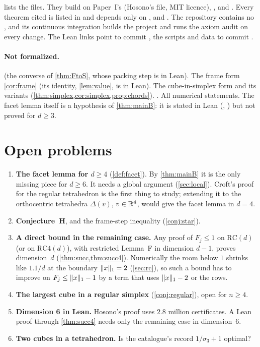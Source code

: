 \documentclass[11pt,a4paper]{article}
\begin{document}
 lists the files. They build on Paper~I's  (Hosono's file, MIT licence), ,  and . Every theorem cited is listed in  and depends only on ,  and . The repository contains no , and its continuous integration builds the project and runs the axiom audit on every change. The Lean links point to commit \leancommitshort, the scripts and data to commit \evidencecommit.

\paragraph{Not formalized.}  (the converse of \cref{thm:FtoS}, whose packing step is in Lean). The frame form \cref{cor:frame} (its identity, \cref{lem:value}, is in Lean). The cube-in-simplex form and its variants (\cref{thm:simplex,cor:simplex,prop:chords}). . All numerical statements. The facet lemma itself is a hypothesis of \cref{thm:mainB}: it is stated in Lean (, ) but not proved for $d\ge3$.

\section{Open problems}\label{sec:open}
\begin{enumerate}
\item \textbf{The facet lemma for $d\ge4$} (\cref{def:facet}). By \cref{thm:mainB} it is the only missing piece for $d\ge6$. It needs a global argument (\cref{sec:local}). Croft's proof for the regular tetrahedron is the first thing to study; extending it to the orthocentric tetrahedra $\Delta(v)$, $v\in\mathbb R^4$, would give the facet lemma in $d=4$.
\item \textbf{Conjecture~H}, and the frame-step inequality (\cref{conj:star}).
\item \textbf{A direct bound in the remaining case.} Any proof of $F_j\le1$ on $\mathrm{RC}(d)$ (or on $\mathrm{RC4}(d)$), with restricted Lemma~F in dimension $d-1$, proves dimension~$d$ (\cref{thm:succ,thm:succ4}). Numerically the room below $1$ shrinks like $1.1/d$ at the boundary $\lVert x\rVert_1=2$ (\cref{sec:rc}), so such a bound has to improve on $F_j\le\lVert x\rVert_1-1$ by a term that uses $\lVert x\rVert_1-2$ or the rows.
\item \textbf{The largest cube in a regular simplex} (\cref{conj:regular}), open for $n\ge4$.
\item \textbf{Dimension 6 in Lean.} Hosono's proof uses $2.8$ million certificates. A Lean proof through \cref{thm:succ4} needs only the remaining case in dimension~$6$.
\item \textbf{Two cubes in a tetrahedron.} Is the catalogue's record $1/\sigma_3+1$ optimal?
\end{enumerate}
\end{document}
